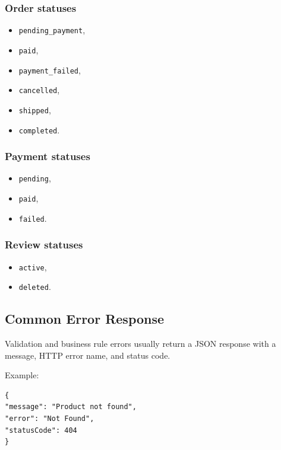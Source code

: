 \subsubsection{Order statuses}

\begin{itemize}
    \item \texttt{pending\_payment},
    \item \texttt{paid},
    \item \texttt{payment\_failed},
    \item \texttt{cancelled},
    \item \texttt{shipped},
    \item \texttt{completed}.
\end{itemize}

\subsubsection{Payment statuses}

\begin{itemize}
    \item \texttt{pending},
    \item \texttt{paid},
    \item \texttt{failed}.
\end{itemize}

\subsubsection{Review statuses}

\begin{itemize}
    \item \texttt{active},
    \item \texttt{deleted}.
\end{itemize}

\subsection{Common Error Response}

Validation and business rule errors usually return a JSON response with a message, HTTP error name, and status code.

Example:

\begin{verbatim}
{
"message": "Product not found",
"error": "Not Found",
"statusCode": 404
}
\end{verbatim}

